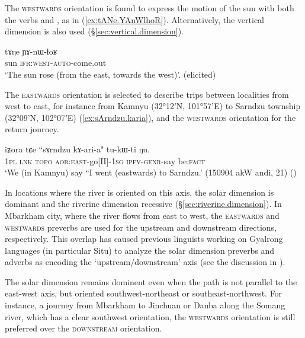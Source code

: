 The \textsc{westwards} orientation is found to express the motion of the sun with both the verbs  and , as in (\ref{ex:tANe.YAnWlhoR}). Alternatively, the vertical dimension is also used (§\ref{sec:vertical.dimension}).

\begin{exe}
\ex \label{ex:tANe.YAnWlhoR}
\gll tɤŋe ɲɤ-nɯ-ɬoʁ \\
sun \textsc{ifr}:\textsc{west}-\textsc{auto}-come.out \\
\glt `The sun rose (from the east, towards the west)'. (elicited)
\end{exe}

The \textsc{eastwards} orientation is selected to describe trips between localities from west to east, for instance from Kamnyu (32°12'N, 101°57'E) to Sarndzu township (32°09'N, 102°07'E) (\ref{ex:sArndzu.karia}), and the \textsc{westwards} orientation for the return journey.

\begin{exe}
\ex \label{ex:sArndzu.karia}
\gll  iʑora tɕe ``sɤrndzu kɤ-ari-a" tu-kɯ-ti ŋu. \\
\textsc{1pl} \textsc{lnk}  \textsc{topo} \textsc{aor}:\textsc{east}-go[II]-\textsc{1sg} \textsc{ipfv}-\textsc{genr}-say be:\textsc{fact} \\
\glt `We (in Kamnyu) say ``I went (eastwards) to Sarndzu.' (150904 akW andi, 21) ()
\end{exe}

In locations where the river is oriented on this axis, the solar dimension is dominant and the riverine dimension recessive (§\ref{sec:riverine.dimension}). In Mbarkham city, where the river flows from east to west, the \textsc{eastwards} and \textsc{westwards} preverbs are used for the upstream and downstream directions, respectively. This overlap has caused previous linguists working on Gyalrong languages (in particular Situ) to analyze the solar dimension preverbs and adverbs as encoding the `upstream/downstream' axis (see the discussion in \citealt{lin02dimension}).

The solar dimension remains dominent even when the path is not parallel to the east-west axis, but oriented southwest-northeast or southeast-northwest. For instance, a journey from Mbarkham to Jinchuan or Danba along the Somang river, which has a clear southwest orientation, the \textsc{westwards} orientation is still preferred over the \textsc{downstream} orientation.

